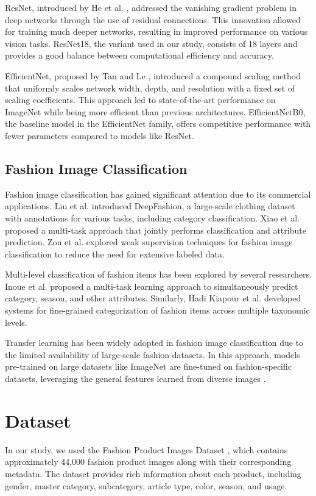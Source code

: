 \documentclass[10pt,journal,compsoc]{IEEEtran}
\begin{document}
ResNet, introduced by He et al. \cite{he2016deep}, addressed the vanishing gradient problem in deep networks through the use of residual connections. This innovation allowed for training much deeper networks, resulting in improved performance on various vision tasks. ResNet18, the variant used in our study, consists of 18 layers and provides a good balance between computational efficiency and accuracy.

EfficientNet, proposed by Tan and Le \cite{tan2019efficientnet}, introduced a compound scaling method that uniformly scales network width, depth, and resolution with a fixed set of scaling coefficients. This approach led to state-of-the-art performance on ImageNet while being more efficient than previous architectures. EfficientNetB0, the baseline model in the EfficientNet family, offers competitive performance with fewer parameters compared to models like ResNet.

\subsection{Fashion Image Classification}
Fashion image classification has gained significant attention due to its commercial applications. Liu et al. \cite{liu2016deepfashion} introduced DeepFashion, a large-scale clothing dataset with annotations for various tasks, including category classification. Xiao et al. \cite{xiao2017fashion} proposed a multi-task approach that jointly performs classification and attribute prediction. Zou et al. \cite{zou2019fashion} explored weak supervision techniques for fashion image classification to reduce the need for extensive labeled data.

Multi-level classification of fashion items has been explored by several researchers. Inoue et al. \cite{inoue2017multi} proposed a multi-task learning approach to simultaneously predict category, season, and other attributes. Similarly, Hadi Kiapour et al. \cite{kiapour2015where} developed systems for fine-grained categorization of fashion items across multiple taxonomic levels.

Transfer learning has been widely adopted in fashion image classification due to the limited availability of large-scale fashion datasets. In this approach, models pre-trained on large datasets like ImageNet are fine-tuned on fashion-specific datasets, leveraging the general features learned from diverse images \cite{yosinski2014transferable}.

\section{Dataset}
In our study, we used the Fashion Product Images Dataset \cite{aggarwal2019fashion}, which contains approximately 44,000 fashion product images along with their corresponding metadata. The dataset provides rich information about each product, including gender, master category, subcategory, article type, color, season, and usage.
\end{document}
